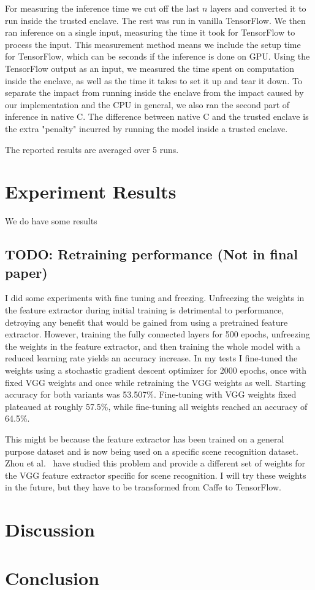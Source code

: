 \documentclass[11pt,twocolumn]{article}
\newcommand{\tf}{TensorFlow}
\begin{document}
For measuring the inference time we cut off the last $n$ layers and converted it to run inside the trusted enclave.
The rest was run in vanilla \tf{}.
We then ran inference on a single input, measuring the time it took for \tf{} to process the input.
This measurement method means we include the setup time for \tf{}, which can be seconds if the inference is done on GPU.
Using the \tf{} output as an input, we measured the time spent on computation inside the enclave, as well as the time it takes to set it up and tear it down.
To separate the impact from running inside the enclave from the impact caused by our implementation and the CPU in general, we also ran the second part of inference in native C.
The difference between native C and the trusted enclave is the extra "penalty" incurred by running the model inside a trusted enclave.

The reported results are averaged over 5 runs.

\section{Experiment Results}
\label{sec:results}

We do have some results

\subsection{TODO: Retraining performance (Not in final paper)}

I did some experiments with fine tuning and freezing.
Unfreezing the weights in the feature extractor during initial training is detrimental to performance, detroying any benefit that would be gained from using a pretrained feature extractor.
However, training the fully connected layers for 500 epochs, unfreezing the weights in the feature extractor, and then training the whole model with a reduced learning rate yields an accuracy increase.
In my tests I fine-tuned the weights using a stochastic gradient descent optimizer for 2000 epochs, once with fixed VGG weights and once while retraining the VGG weights as well.
Starting accuracy for both variants was 53.507\%.
Fine-tuning with VGG weights fixed plateaued at roughly 57.5\%, while fine-tuning all weights reached an accuracy of 64.5\%.

This might be because the feature extractor has been trained on a general purpose dataset and is now being used on a specific scene recognition dataset.
Zhou et al.~\cite{zhou_learning_2014} have studied this problem and provide a different set of weights for the VGG feature extractor specific for scene recognition.
I will try these weights in the future, but they have to be transformed from Caffe to \tf{}.

\section{Discussion}
\label{sec:discussion}

\section{Conclusion}
\label{sec:conclusion}



\end{document}
